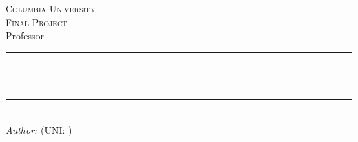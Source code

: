 \makeatletter
\begin{titlepage}
    \newcommand{\HRule}{\rule{\linewidth}{0.5mm}}
    
    \center
    
    \textsc{\LARGE Columbia University}
    \\[1.5cm]
    
    \textsc{\Large \class \space Final Project}
    \\[0.5cm]
    
    {\large Professor \professor}
    \\[1.5cm]
    
    \HRule
    \\[0.6cm]
    
    { \huge \bfseries \@title }
    \\[0.4cm]
    
    \HRule
    \\[1.5cm]
    
    \Large \emph{Author:} \space
    \@author \space (UNI: \uni)
    \\[3cm]
    
    {\large \@date}
    \\[3cm]
    
    \vfill
\end{titlepage}
\makeatother
